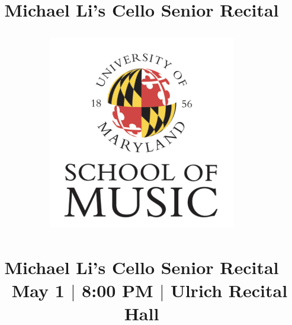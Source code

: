 \documentclass[dvipsnames]{memoir}
\date{}
\title{Michael Li's Cello Senior Recital}
\begin{document}
  \title{
  \includegraphics{logo.png} \\ ~ \\
  \Huge{\textbf{Michael Li's Cello Senior Recital}} \\~
  \huge{\textbf{May 1 $\mid$ 8:00 PM $\mid$ Ulrich Recital Hall}}

}
  \maketitle

  \noindent
\end{document}
